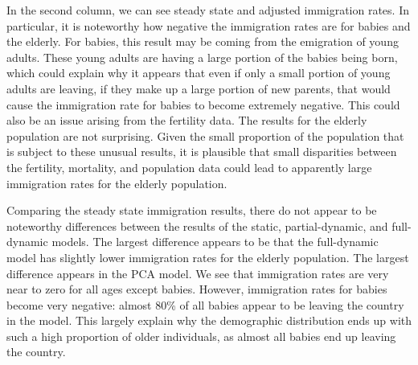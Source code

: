 \documentclass[10pt]{article}
\numberwithin{equation}{subsection}
\begin{document}
\par In the second column, we can see steady state and adjusted immigration rates. In particular, it is noteworthy how negative the immigration rates are for babies and the elderly. For babies, this result may be coming from the emigration of young adults. These young adults are having a large portion of the babies being born, which could explain why it appears that even if only a small portion of young adults are leaving, if they make up a large portion of new parents, that would cause the immigration rate for babies to become extremely negative. This could also be an issue arising from the fertility data. The results for the elderly population are not surprising. Given the small proportion of the population that is subject to these unusual results, it is plausible that small disparities between the fertility, mortality, and population data could lead to apparently large immigration rates for the elderly population.

\par Comparing the steady state immigration results, there do not appear to be noteworthy differences between the results of the static, partial-dynamic, and full-dynamic models. The largest difference appears to be that the full-dynamic model has slightly lower immigration rates for the elderly population. The largest difference appears in the PCA model. We see that immigration rates are very near to zero for all ages except babies. However, immigration rates for babies become very negative: almost 80\% of all babies appear to be leaving the country in the model. This largely explain why the demographic distribution ends up with such a high proportion of older individuals, as almost all babies end up leaving the country.
\end{document}
